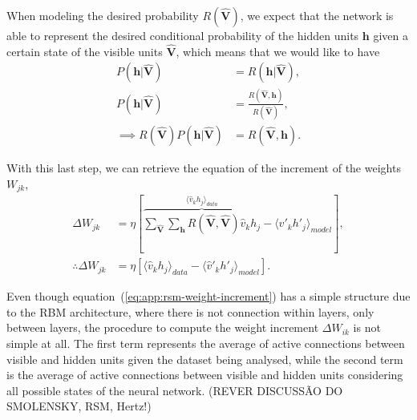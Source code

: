 When modeling the desired probability $R(\mathbf{\hat{V}})$, we expect that the network is able to represent the desired conditional probability of the hidden units $\mathbf{h}$ given a certain state of the visible units $\mathbf{\hat{V}}$, which means that we would like to have
\begin{align}
    \label{eq:app:rsm-desired-conditional-hidden}
    P(\mathbf{h}|\mathbf{\hat{V}}) &= R(\mathbf{h}|\mathbf{\hat{V}}), \\ %
    P(\mathbf{h}|\mathbf{\hat{V}}) &= \frac{R(\mathbf{\hat{V}}, \mathbf{h})}{R(\mathbf{\hat{V}})}, \nonumber \\ %
    \label{eq:app:rsm-wjk-likelihood}
    \implies R(\mathbf{\hat{V}}) P(\mathbf{h}|\mathbf{\hat{V}}) &= R(\mathbf{\hat{V}}, \mathbf{h}). 
\end{align}

With this last step, we can retrieve the equation of the increment of the weights $W_{jk}$,
\begin{align}
    \label{eq:app:rsm-weight-increment}
    \Delta W_{jk} &= \eta \left[ \overbrace{\sum_{\mathbf{\hat{V}}} \sum_{\mathbf{h}} R(\mathbf{\hat{V}}, \mathbf{\hat{V}}) \hat{v}_{k} h_{j}}^{\langle \hat{v}_{k} h_{j} \rangle_{data}} - \langle \hat{v}'_{k} h'_{j} \rangle_{model} \right], \nonumber \\ %
    \therefore \Delta W_{jk} &= \eta \left[ \langle \hat{v}_{k} h_{j} \rangle_{data} - \langle \hat{v}'_{k} h'_{j} \rangle_{model} \right]. 
\end{align}

Even though equation~(\ref{eq:app:rsm-weight-increment}) has a simple structure due to the RBM architecture, where there is not connection within layers, only between layers, the procedure to compute the weight increment $\Delta W_{ik}$ is not simple at all. The first term represents the average of active connections between visible and hidden units given the dataset being analysed, while the second term is the average of active connections between visible and hidden units considering all possible states of the neural network. (REVER DISCUSSÃO DO SMOLENSKY, RSM, Hertz!)

